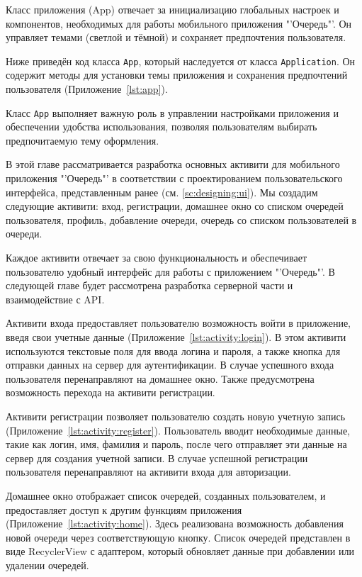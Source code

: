 
Класс приложения (App) отвечает за инициализацию глобальных настроек
и компонентов, необходимых для работы мобильного приложения "'Очередь"'.
Он управляет темами (светлой и тёмной)
и сохраняет предпочтения пользователя.\par
Ниже приведён код класса \texttt{App},
который наследуется от класса \texttt{Application}.
Он содержит методы для установки темы приложения
и сохранения предпочтений пользователя (Приложение~\ref{lst:app}).\par
Класс \texttt{App} выполняет важную роль в управлении настройками приложения
и обеспечении удобства использования,
позволяя пользователям выбирать предпочитаемую тему оформления.


В этой главе рассматривается разработка основных активити
для мобильного приложения "'Очередь"'
в соответствии с проектированием пользовательского интерфейса,
представленным ранее (см. \ref{sc:designing:ui}).
Мы создадим следующие активити:
вход, регистрации, домашнее окно со списком очередей пользователя,
профиль, добавление очереди, очередь со списком пользователей в очереди.\par
Каждое активити отвечает за свою функциональность
и обеспечивает пользователю удобный интерфейс для работы
с приложением "'Очередь"'. В следующей главе будет рассмотрена разработка
серверной части и взаимодействие с API.

Активити входа предоставляет пользователю возможность войти
в приложение, введя свои учетные данные (Приложение~\ref{lst:activity:login}).
В этом активити используются текстовые поля для ввода логина и пароля,
а также кнопка для отправки данных на сервер для аутентификации.
В случае успешного входа пользователя перенаправляют на домашнее окно.
Также предусмотрена возможность перехода на активити регистрации.

Активити регистрации позволяет пользователю создать новую учетную запись
(Приложение~\ref{lst:activity:register}).
Пользователь вводит необходимые данные, такие как логин, имя, фамилия и пароль,
после чего отправляет эти данные на сервер для создания учетной записи.
В случае успешной регистрации пользователя перенаправляют на активити входа
для авторизации.

Домашнее окно отображает список очередей, созданных пользователем,
и предоставляет доступ к другим функциям приложения
(Приложение~\ref{lst:activity:home}).
Здесь реализована возможность добавления новой очереди
через соответствующую кнопку. Список очередей представлен в виде RecyclerView
с адаптером, который обновляет данные при добавлении или удалении очередей.

